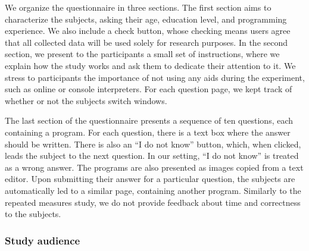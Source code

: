 We organize the questionnaire in three sections. The first section aims to characterize the subjects, asking their age, education level, and programming experience. We also include a check button, whose checking means users agree that all collected data will be used solely for research purposes. In the second section, we present to the participants a small set of instructions, where we explain how the study works and ask them to dedicate their attention to it. We stress to participants the importance of not using any aids during the experiment, such as online or console interpreters. For each question page, we kept track of whether or not the subjects switch windows. 

The last section of the questionnaire presents a sequence of ten questions, each containing a program. For each question, there is a text box where the answer should be written. There is also an ``I do not know'' button, which, when clicked, leads the subject to the next question. In our setting, ``I do not know'' is treated as a wrong answer. The programs are also presented as images copied from a text editor. Upon submitting their answer for a particular question, the subjects are automatically led to a similar page, containing another program. Similarly to the repeated measures study, we do not provide feedback about time and correctness to the subjects.




\subsubsection*{Study audience}


